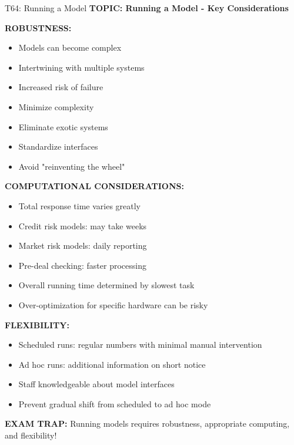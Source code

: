 \documentclass[8pt]{beamer}
\begin{document}
	\begin{frame}{T64: Running a Model}
		\fontsize{6.5}{7.5}\selectfont
		\textbf{TOPIC: Running a Model - Key Considerations}
		
		\vspace{0.1cm}
		\textbf{ROBUSTNESS:}
		\begin{itemize}
			\item Models can become complex
			\item Intertwining with multiple systems
			\item Increased risk of failure
			\item Minimize complexity
			\item Eliminate exotic systems
			\item Standardize interfaces
			\item Avoid "reinventing the wheel"
		\end{itemize}
		
		\vspace{0.1cm}
		\textbf{COMPUTATIONAL CONSIDERATIONS:}
		\begin{itemize}
			\item Total response time varies greatly
			\item Credit risk models: may take weeks
			\item Market risk models: daily reporting
			\item Pre-deal checking: faster processing
			\item Overall running time determined by slowest task
			\item Over-optimization for specific hardware can be risky
		\end{itemize}
		
		\vspace{0.1cm}
		\textbf{FLEXIBILITY:}
		\begin{itemize}
			\item Scheduled runs: regular numbers with minimal manual intervention
			\item Ad hoc runs: additional information on short notice
			\item Staff knowledgeable about model interfaces
			\item Prevent gradual shift from scheduled to ad hoc mode
		\end{itemize}
		
		\textcolor{myred}{\textbf{EXAM TRAP:}} Running models requires \textcolor{myblue}{robustness, appropriate computing, and flexibility}!
	\end{frame}
	
\end{document}
